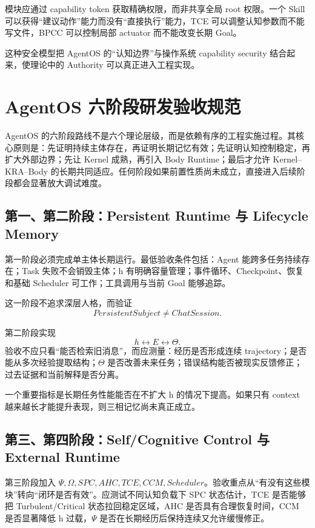 模块应通过 capability token 获取精确权限，而非共享全局 root 权限。一个 Skill 可以获得“建议动作”能力而没有“直接执行”能力，TCE 可以调整认知参数而不能写文件，BPCC 可以控制局部 actuator 而不能改变长期 Goal。

这种安全模型把 AgentOS 的“认知边界”与操作系统 capability security 结合起来，使理论中的 Authority 可以真正进入工程实现。


\chapter{AgentOS 六阶段研发验收规范}
\label{app:roadmap}

\begin{chapterlead}
AgentOS 的六阶段路线不是六个理论层级，而是依赖有序的工程实施过程。其核心原则是：先证明持续主体存在，再证明长期记忆有效；先证明认知控制稳定，再扩大外部边界；先让 Kernel 成熟，再引入 Body Runtime；最后才允许 Kernel--KRA--Body 的长期共同适应。任何阶段如果前置性质尚未成立，直接进入后续阶段都会显著放大调试难度。
\end{chapterlead}

\section{第一、第二阶段：Persistent Runtime 与 Lifecycle Memory}

第一阶段必须完成单主体长期运行。最低验收条件包括：Agent 能跨多任务持续存在；Task 失败不会销毁主体；h 有明确容量管理；事件循环、Checkpoint、恢复和基础 Scheduler 可工作；工具调用与当前 Goal 能够追踪。

这一阶段不追求深层人格，而验证
\[
PersistentSubject\neq ChatSession.
\]

第二阶段实现
\[
h\leftrightarrow E\leftrightarrow\Theta.
\]
验收不应只看“能否检索旧消息”，而应测量：经历是否形成连续 trajectory；是否能从多次经验提取结构；$\Theta$ 是否改善未来任务；错误结构能否被现实反馈修正；过去证据和当前解释是否分离。

一个重要指标是长期任务性能能否在不扩大 h 的情况下提高。如果只有 context 越来越长才能提升表现，则三相记忆尚未真正成立。

\section{第三、第四阶段：Self/Cognitive Control 与 External Runtime}

第三阶段加入 $\Psi,\Omega,SPC,AHC,TCE,CCM,Scheduler$。验收重点从“有没有这些模块”转向“闭环是否有效”。应测试不同认知负载下 SPC 状态估计，TCE 是否能够把 Turbulent/Critical 状态拉回稳定区域，AHC 是否具有合理恢复时间，CCM 是否显著降低 h 过载，$\Psi$ 是否在长期经历后保持连续又允许缓慢修正。

